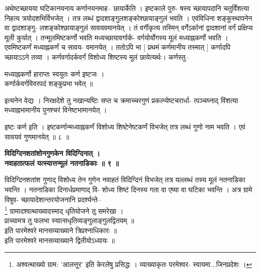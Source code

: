 \documentclass[11pt, openany]{book}
\begin{document}
{{{{\vspace{2mm}
\justifying
 अथेष्टच्छायया घटिकानयनाय कर्णानयनमाह-- छायार्केति । इष्टकाले
पुरु-
षस्य च्छायापदानि चतुर्विंशत्या निहत्य त्रयोदशभिर्विभजेत् । तत्र
लब्धं द्वादशाङ्गुलशङ्कोश्छायाङ्गुलं
भवति । एवंविधिना शङ्कुस्थापनेन वा
द्वादशाङ्गु-
लशङ्कोश्छायाङ्गुलं सावयवमानयेत् । तं वर्गीकृत्य तस्मिन् वर्गेऽर्कानां
द्वादशानां
वर्गं प्रक्षिप्य मूली कुर्यात् । तन्मूलमिष्टकर्णो भवति
मध्यच्छायावर्गार्क-
वर्गयोर्योगस्य मूलं मध्याह्नकर्णो भवति । एवमिष्टकर्णं मध्याह्नकर्णं च
सावय-
वमानयेत् । ततोऽपि भा [ प्रथमं कर्णमानीय तस्मात् ] कर्णादपि
च्छायाऽऽने
तव्या । कर्णवर्गादर्कवर्गं विशोध्य शिष्टस्य मूलं छायेत्यर्थः।
कर्णस्तु--

\vspace{2mm}
\centering
 मध्याह्नकर्णो हाराप्तः स्वयुतः कर्ण इष्टजः ।\\
 \hspace{-1cm}
 कर्णार्कवर्गविवरपदं शङ्कुप्रभा भवेत् ॥

\vspace{2mm}
\justifying
इत्यनेन वेद्यः । निरक्षदेशे तु नखान्यष्टिः सप्त च क्रमाच्चरगुणं
प्रकल्प्येष्टचरार्धा-
त्पञ्चघ्नाद् विंशत्या मध्याह्नभामानीय पुनश्चरं विनेष्टभामानयेत् ।

\newpage
\thispagestyle{fancy}
\fancyhf{}
\rhead{[ग्रहणाधिकारः]}
\justifying
 इष्टः कर्ण इति । इष्टकर्णान्मध्याह्नकर्णं विशोध्य शिष्टेनेष्टकर्णं
विभजेत्
तत्र लब्धं गुणो नाम भवति । एवं सावयवं गुणमानयेत् ॥ ८ ॥

\vspace{2mm}
\centering
\textbf{
\hspace{-1.5cm}
 विदिग्दिनशतांशोनगुणकेन विदिग्दिनात् ।\\
 नवाहतात्फलं यत्स्यात्तन्मूलं नतनाडिकाः ॥ ९ ॥}

\vspace{2mm}
\justifying
 विदिग्दिनशतांश गुणाद् विशोध्य तेन गुणेन नवाहतं विदिग्दिनं विभजेत्
तत्र यल्लब्धं तस्य मूलं नतनाडिका भवन्ति । नतनाडिका दिनार्धप्रमाणाद्
वि-
शोध्य शिष्टं दिनस्य गता वा एष्या वा घटिका भवन्ति । अत्र ग्रामे
विषुव-
च्छायादेशान्तरयोजनानि प्रदर्श्यन्ते--\\

\vspace{2mm}\centering
\hspace{-0.5cm}
 \renewcommand{\thefootnote}{*}\footnote{अश्वत्थाख्यो ग्राम: 'आलत्तूर' इति केरलेषु प्रसिद्धः । व्याख्याकृतः
परमेश्वर-
स्वायमा...जिनप्रदेशः ।}
ग्रामादश्वत्थाख्यादस्माद् धृतियोजने तु समरेखा ।\\
\hspace{0.8cm}
 प्राच्यामत्र तु फलभा स्यात्सधृतिव्यङ्गुलाङ्गुलद्वितयम् ॥\\
 इति पारमेश्वरे मानसव्याख्याने त्रिप्रश्नाधिकारः ॥\\
 इति पारमेश्वरे मानसव्याख्याने द्वितीयोऽध्यायः ॥\\

}}}}
\end{document}
